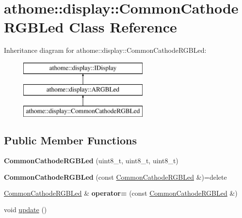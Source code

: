\hypertarget{classathome_1_1display_1_1_common_cathode_r_g_b_led}{}\section{athome\+:\+:display\+:\+:Common\+Cathode\+R\+G\+B\+Led Class Reference}
\label{classathome_1_1display_1_1_common_cathode_r_g_b_led}
Inheritance diagram for athome\+:\+:display\+:\+:Common\+Cathode\+R\+G\+B\+Led\+:\begin{figure}[H]
\begin{center}
\leavevmode
\includegraphics[height=3.000000cm]{classathome_1_1display_1_1_common_cathode_r_g_b_led}
\end{center}
\end{figure}
\subsection*{Public Member Functions}
\begin{DoxyCompactItemize}
\item 
\mbox{\label{classathome_1_1display_1_1_common_cathode_r_g_b_led_a4449607163d583410574fc7c138b012b}} 
{\bfseries Common\+Cathode\+R\+G\+B\+Led} (uint8\+\_\+t, uint8\+\_\+t, uint8\+\_\+t)
\item 
\mbox{\label{classathome_1_1display_1_1_common_cathode_r_g_b_led_aaf13aacaf891bb7594cf6994018c1b4a}} 
{\bfseries Common\+Cathode\+R\+G\+B\+Led} (const \mbox{\hyperlink{classathome_1_1display_1_1_common_cathode_r_g_b_led}{Common\+Cathode\+R\+G\+B\+Led}} \&)=delete
\item 
\mbox{\label{classathome_1_1display_1_1_common_cathode_r_g_b_led_a700bea6a579e9c89aac93610671d47a4}} 
\mbox{\hyperlink{classathome_1_1display_1_1_common_cathode_r_g_b_led}{Common\+Cathode\+R\+G\+B\+Led}} \& {\bfseries operator=} (const \mbox{\hyperlink{classathome_1_1display_1_1_common_cathode_r_g_b_led}{Common\+Cathode\+R\+G\+B\+Led}} \&)
\item 
void \mbox{\hyperlink{classathome_1_1display_1_1_common_cathode_r_g_b_led_ab78ab6aef619d8e0941dd11d4cfbb545}{update}} ()
\end{DoxyCompactItemize}


